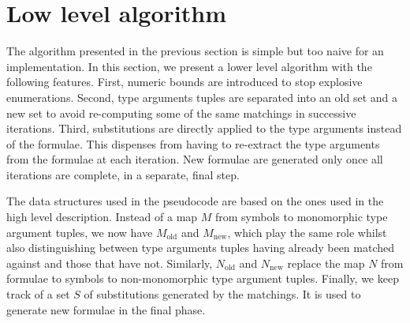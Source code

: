 \documentclass[]{ceurart}
\begin{document}
\section{Low level algorithm}
\label{sec:low-level-algorithm}

The algorithm presented in the previous section is simple but too naive for an implementation. In this section, we present a lower level algorithm with the following features.
First, numeric bounds are introduced to stop explosive enumerations.
Second, type arguments tuples are separated into an old set and a new set to avoid re-computing some of the same matchings in successive iterations.
Third, substitutions are directly applied to the type arguments instead of the formulae. This dispenses from having to re-extract the type arguments from the formulae at each iteration. New formulae are generated only once all iterations are complete, in a separate, final step.

The data structures used in the pseudocode are based on the ones used in the high level description. Instead of a map \(M\) from symbols to monomorphic type argument tuples, we now have \(M_\text{old}\) and \(M_\text{new}\), which play the same role whilst also distinguishing between type arguments tuples having already been matched against and those that have not. Similarly, \(N_\text{old}\) and \(N_\text{new}\) replace the map \(N\) from formulae to symbols to non-monomorphic type argument tuples. Finally, we keep track of a set \(S\) of substitutions generated by the matchings. It is used to generate new formulae in the final phase.
\end{document}
